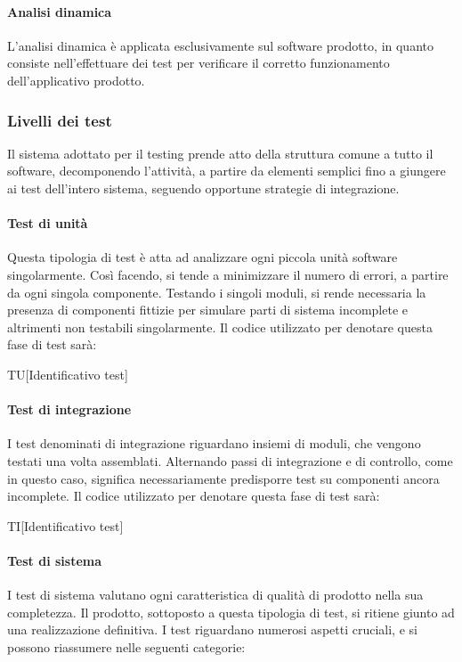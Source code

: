 			\paragraph{Analisi dinamica}
			L'analisi dinamica è applicata esclusivamente sul software prodotto, in quanto consiste nell'effettuare dei test per verificare il corretto funzionamento dell'applicativo prodotto.
	
			
		\subsubsection{Livelli dei test}
		Il sistema adottato per il testing prende atto della struttura comune a tutto il software, decomponendo l'attività, a partire da elementi semplici fino a giungere ai test dell'intero sistema, seguendo opportune strategie di integrazione.
		
		\paragraph{Test di unità}
		Questa tipologia di test è atta ad analizzare ogni piccola unità software singolarmente. Così facendo, si tende a minimizzare il numero di errori, a partire da ogni singola componente. Testando i singoli moduli, si rende necessaria la presenza di componenti fittizie per simulare parti di sistema incomplete e altrimenti non testabili singolarmente. Il codice utilizzato per denotare questa fase di test sarà:
		
		\begin{center}
			TU[Identificativo test]
		\end{center}
	
		\paragraph{Test di integrazione}
		I test denominati di integrazione riguardano insiemi di moduli, che vengono testati una volta assemblati. Alternando passi di integrazione e di controllo, come in questo caso, significa necessariamente predisporre test su componenti ancora incomplete. Il codice utilizzato per denotare questa fase di test sarà:
		
		\begin{center}
			TI[Identificativo test]
		\end{center}
		
		\paragraph{Test di sistema}
		I test di sistema valutano ogni caratteristica di qualità di prodotto nella sua completezza. Il prodotto, sottoposto a questa tipologia di test, si ritiene giunto ad una realizzazione definitiva. I test riguardano numerosi aspetti cruciali, e si possono riassumere nelle seguenti categorie:
		

